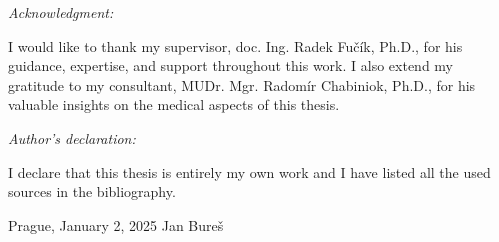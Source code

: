 \newpage
\noindent \vspace*{0pt} %
\emph{\Large{}Acknowledgment:}{\Large\par}

\noindent I would like to thank my supervisor, doc. Ing. Radek Fučík, Ph.D., for his guidance, expertise, and support throughout this work. I also extend my gratitude to my consultant, MUDr. Mgr. Radomír Chabiniok, Ph.D., for his valuable insights on the medical aspects of this thesis.

\vspace*{\fill} %

\noindent \emph{\Large{}Author’s declaration:}{\Large\par}

\noindent I declare that this thesis is entirely my own work and I have listed all the used sources in the bibliography.

\bigskip{}

\noindent Prague, January 2, 2025 \hfill{}Jan Bureš

\newpage{}